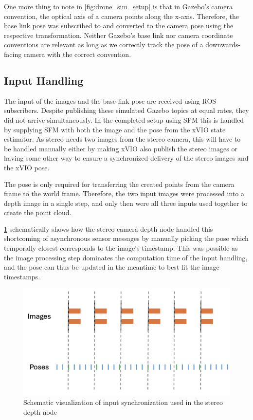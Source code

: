One more thing to note in \cref{fig:drone_sim_setup} is that in Gazebo's camera convention, the optical axis of a camera points along the x-axis. Therefore, the base link pose was subscribed to and converted to the camera pose using the respective transformation. Neither Gazebo's base link nor camera coordinate conventions are relevant as long as we correctly track the pose of a downwards-facing camera with the correct convention.

\subsection{Input Handling}
The input of the images and the base link pose are received using ROS subscribers. Despite publishing these simulated Gazebo topics at equal rates, they did not arrive simultaneously. In the completed setup using SFM this is handled by supplying SFM with both the image and the pose from the xVIO state estimator. As stereo needs two images from the stereo camera, this will have to be handled manually either by making xVIO also publish the stereo images or having some other way to ensure a synchronized delivery of the stereo images and the xVIO pose.

The pose is only required for transferring the created points from the camera frame to the world frame. Therefore, the two input images were processed into a depth image in a single step, and only then were all three inputs used together to create the point cloud. 

\cref{fig:input_synch} schematically shows how the stereo camera depth node handled this shortcoming of asynchronous sensor messages by manually picking the pose which temporally closest corresponds to the image's timestamp. This was possible as the image processing step dominates the computation time of the input handling, and the pose can thus be updated in the meantime to best fit the image timestamps.

\begin{figure}[h]
\centering
\includegraphics[scale=0.26]{images/stereo_camera_depth/input_synchronization.png}
\caption{Schematic visualization of input synchronization used in the stereo depth node}
\label{fig:input_synch}
\end{figure}
\clearpage %


